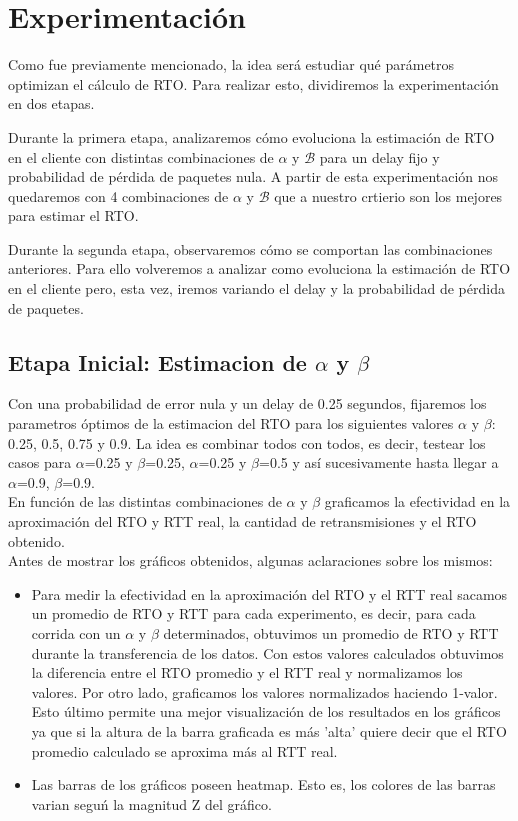 \section{Experimentaci\'on}

Como fue previamente mencionado, la idea ser\'a estudiar qu\'e par\'ametros optimizan el c\'alculo de RTO. Para realizar esto, dividiremos la experimentaci\'on en dos etapas.

Durante la primera etapa, analizaremos c\'omo evoluciona la estimaci\'on de RTO en el cliente con distintas combinaciones de $\alpha$ y $\mathcal{B}$ para un delay fijo y probabilidad de p\'erdida de paquetes nula. A partir de esta experimentaci\'on nos quedaremos con 4 combinaciones de $\alpha$ y $\mathcal{B}$ que a nuestro crtierio son los mejores para estimar el RTO.

Durante la segunda etapa, observaremos c\'omo se comportan las combinaciones anteriores. Para ello volveremos a analizar como evoluciona la estimaci\'on de RTO en el cliente pero, esta vez, iremos variando el delay y la probabilidad de p\'erdida de paquetes. 

\subsection{Etapa Inicial: Estimacion de $\alpha$ y $\beta$}
Con una probabilidad de error nula y un delay de 0.25 segundos, fijaremos los parametros \'optimos de la estimacion del RTO para los siguientes valores $\alpha$ y $\beta$: 0.25, 0.5, 0.75 y 0.9. La idea es combinar todos con todos, es decir, testear los casos para $\alpha$=0.25 y $\beta$=0.25, $\alpha$=0.25 y $\beta$=0.5 y as\'i sucesivamente hasta llegar a $\alpha$=0.9, $\beta$=0.9.\\

En funci\'on de las distintas combinaciones de $\alpha$ y $\beta$ graficamos la efectividad en la aproximaci\'on del RTO y RTT real, la cantidad de retransmisiones y el RTO obtenido.\\

Antes de mostrar los gr\'aficos obtenidos, algunas aclaraciones sobre los mismos:
\begin{itemize}
	\item Para medir la efectividad en la aproximaci\'on del RTO y el RTT real sacamos un promedio de RTO y RTT para cada experimento, es decir, para cada corrida con un $\alpha$ y $\beta$ determinados, obtuvimos un promedio de RTO y RTT durante la transferencia de los datos. Con estos valores calculados obtuvimos la diferencia entre el RTO promedio y el RTT real y normalizamos los valores. Por otro lado, graficamos los valores normalizados haciendo 1-valor. Esto \'ultimo permite una mejor visualizaci\'on de los resultados en los gr\'aficos ya que si la altura de la barra graficada es m\'as 'alta' quiere decir que el RTO promedio calculado se aproxima m\'as al RTT real. 
	\item Las barras de los gr\'aficos poseen heatmap. Esto es, los colores de las barras varian segu\'n la magnitud Z del gr\'afico.
\end{itemize}

